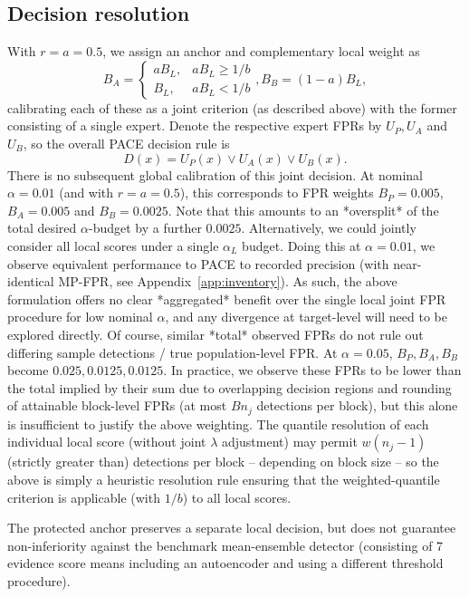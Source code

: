 \subsection{Decision resolution} 
With $r=a=0.5$, we assign an anchor and complementary local weight as
\begin{equation} 
B_A=\begin{cases} aB_L, & aB_L\ge 1/b\\ B_L,& aB_L < 1/b\end{cases}, B_B = (1-a)B_L,
\label{eq:allocation} 
\end{equation} 
calibrating each of these as a joint criterion (as described above) with the former consisting of a single expert. Denote the respective expert FPRs by $U_P, U_A$ and $U_B$, so the overall PACE decision rule is
\begin{equation} 
D(x) = U_P(x) \vee U_A(x) \vee U_B(x). 
\label{eq:decision} 
\end{equation} 
There is no subsequent global calibration of this joint decision. At nominal $\alpha=0.01$ (and with $r=a=0.5$), this corresponds to FPR weights $B_P=0.005$, $B_A=0.005$ and $B_B=0.0025$. Note that this amounts to an *oversplit* of the total desired $\alpha$-budget by a further $0.0025$. Alternatively, we could jointly consider all local scores under a single $\alpha_L$ budget. Doing this at $\alpha=0.01$, we observe equivalent performance to PACE to recorded precision (with near-identical MP-FPR, see Appendix~\ref{app:inventory}). As such, the above formulation offers no clear *aggregated* benefit over the single local joint FPR procedure for low nominal $\alpha$, and any divergence at target-level will need to be explored directly. Of course, similar *total* observed FPRs do not rule out differing sample detections / true population-level FPR. At $\alpha = 0.05$, $B_P, B_A, B_B$ become $0.025, 0.0125, 0.0125$. In practice, we observe these FPRs to be lower than the total implied by their sum due to overlapping decision regions and rounding of attainable block-level FPRs (at most $Bn_j$ detections per block), but this alone is insufficient to justify the above weighting. The quantile resolution of each individual local score (without joint $\lambda$ adjustment) may permit $w(n_j-1)$ (strictly greater than) detections per block -- depending on block size -- so the above is simply a heuristic resolution rule ensuring that the weighted-quantile criterion is applicable (with $1/b$) to all local scores.

The protected anchor preserves a separate local decision, but does not guarantee non-inferiority against the benchmark mean-ensemble detector (consisting of 7 evidence score means including an autoencoder and using a different threshold procedure).


